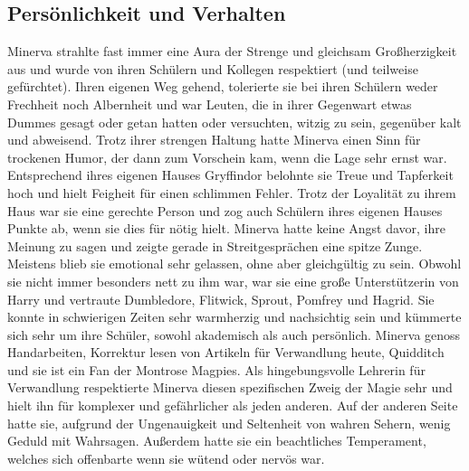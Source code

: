 \documentclass[a4paper, 10pt]{article}
\begin{document}
\subsection*{\Large Persönlichkeit und Verhalten}
Minerva strahlte fast immer eine Aura der Strenge und gleichsam Großherzigkeit aus und wurde von ihren Schülern und Kollegen respektiert (und teilweise gefürchtet). Ihren eigenen Weg gehend, tolerierte sie bei ihren Schülern weder Frechheit noch Albernheit und war Leuten, die in ihrer Gegenwart etwas Dummes gesagt oder getan hatten oder versuchten, witzig zu sein, gegenüber kalt und abweisend. Trotz ihrer strengen Haltung hatte Minerva einen Sinn für trockenen Humor, der dann zum Vorschein kam, wenn die Lage sehr ernst war.
\vspace{10pt}
\newline
{}  
Entsprechend ihres eigenen Hauses Gryffindor belohnte sie Treue und Tapferkeit hoch und hielt Feigheit für einen schlimmen Fehler. Trotz der Loyalität zu ihrem Haus war sie eine gerechte Person und zog auch Schülern ihres eigenen Hauses Punkte ab, wenn sie dies für nötig hielt.
\vspace{10pt}
\newline
{}  
Minerva hatte keine Angst davor, ihre Meinung zu sagen und zeigte gerade in Streitgesprächen eine spitze Zunge. Meistens blieb sie emotional sehr gelassen, ohne aber gleichgültig zu sein. Obwohl sie nicht immer besonders nett zu ihm war, war sie eine große Unterstützerin von Harry und vertraute Dumbledore, Flitwick, Sprout, Pomfrey und Hagrid. Sie konnte in schwierigen Zeiten sehr warmherzig und nachsichtig sein und kümmerte sich sehr um ihre Schüler, sowohl akademisch als auch persönlich.
\vspace{10pt}
\newline
{}  
Minerva genoss Handarbeiten, Korrektur lesen von Artikeln für Verwandlung heute, Quidditch und sie ist ein Fan der Montrose Magpies.
\vspace{10pt}
\newline
{}  
Als hingebungsvolle Lehrerin für Verwandlung respektierte Minerva diesen spezifischen Zweig der Magie sehr und hielt ihn für komplexer und gefährlicher als jeden anderen. Auf der anderen Seite hatte sie, aufgrund der Ungenauigkeit und Seltenheit von wahren Sehern, wenig Geduld mit Wahrsagen.
\vspace{10pt}
\newline
{}  
Außerdem hatte sie ein beachtliches Temperament, welches sich offenbarte wenn sie wütend oder nervös war.
\end{document}
